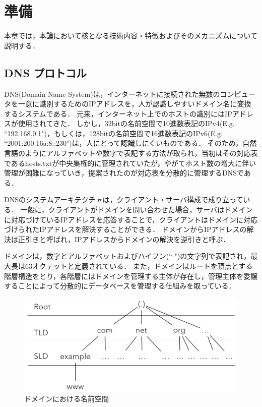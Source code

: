\section{準備}
本章では，本論において核となる技術内容・特徴およびそのメカニズムについて説明する．
\subsection{DNS プロトコル}
\label{sec:dns-protocol}
DNS(Domain Name System)は，インターネットに接続された無数のコンピュータを一意に識別するためのIPアドレスを，人が認識しやすいドメイン名に変換するシステムである．
元来，インターネット上でのホストの識別にはIPアドレスが使用されてきた．
しかし，32bitの名前空間で10進数表記のIPv4(E.g. ``192.168.0.1")，もしくは，128bitの名前空間で16進数表記のIPv6(E.g. ``2001:200:16a:8::230")は，人にとって認識しにくいものである．
そのため，自然言語のようにアルファベットや数字で表記する方法が取られ，当初はその対応表であるhosts.txtが中央集権的に管理されていたが，やがてホスト数の増大に伴い管理が困難になっていき，提案されたのが対応表を分散的に管理するDNSである．

DNSのシステムアーキテクチャは，クライアント・サーバ構成で成り立っている．
一般に，クライアントがドメインを問い合わせた場合，サーバはドメインに対応づけているIPアドレスを応答することで，クライアントはドメインに対応づけられたIPアドレスを解決することができる．
ドメインからIPアドレスの解決は正引きと呼ばれ，IPアドレスからドメインの解決を逆引きと呼ぶ．

ドメインは，数字とアルファベットおよびハイフン(``-")の文字列で表記され，最大長は63オクテットと定義されている．
また，ドメインはルートを頂点とする階層構造をとり，各階層にはドメインを管理する主体が存在し，管理主体を委譲することによって分散的にデータベースを管理する仕組みを取っている．

\begin{figure}[h]
 \centering
 \includegraphics[width=12.0cm]{figure/dns-architecture.png}
 \caption{ドメインにおける名前空間}
 \label{fig:dns-architecture}
\end{figure}

